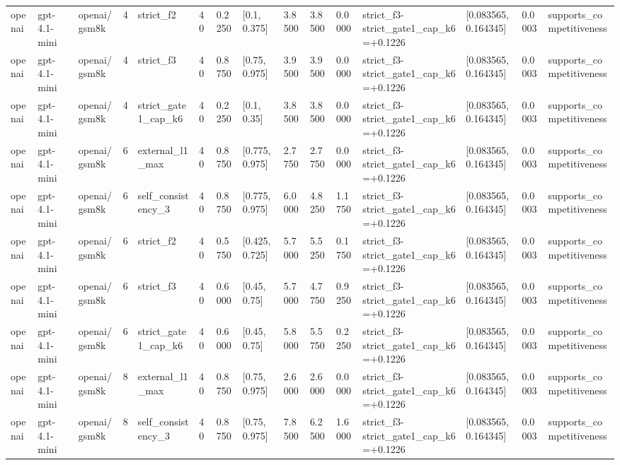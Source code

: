\begin{tabular}{lllllllllllllll}
openai & gpt-4.1-mini & openai/gsm8k & 4 & strict\_f2 & 40 & 0.2250 & [0.1, 0.375] & 3.8500 & 3.8500 & 0.0000 & strict\_f3-strict\_gate1\_cap\_k6=+0.1226 & [0.083565, 0.164345] & 0.0003 & supports\_competitiveness \\
openai & gpt-4.1-mini & openai/gsm8k & 4 & strict\_f3 & 40 & 0.8750 & [0.75, 0.975] & 3.9500 & 3.9500 & 0.0000 & strict\_f3-strict\_gate1\_cap\_k6=+0.1226 & [0.083565, 0.164345] & 0.0003 & supports\_competitiveness \\
openai & gpt-4.1-mini & openai/gsm8k & 4 & strict\_gate1\_cap\_k6 & 40 & 0.2250 & [0.1, 0.35] & 3.8500 & 3.8500 & 0.0000 & strict\_f3-strict\_gate1\_cap\_k6=+0.1226 & [0.083565, 0.164345] & 0.0003 & supports\_competitiveness \\
openai & gpt-4.1-mini & openai/gsm8k & 6 & external\_l1\_max & 40 & 0.8750 & [0.775, 0.975] & 2.7750 & 2.7750 & 0.0000 & strict\_f3-strict\_gate1\_cap\_k6=+0.1226 & [0.083565, 0.164345] & 0.0003 & supports\_competitiveness \\
openai & gpt-4.1-mini & openai/gsm8k & 6 & self\_consistency\_3 & 40 & 0.8750 & [0.775, 0.975] & 6.0000 & 4.8250 & 1.1750 & strict\_f3-strict\_gate1\_cap\_k6=+0.1226 & [0.083565, 0.164345] & 0.0003 & supports\_competitiveness \\
openai & gpt-4.1-mini & openai/gsm8k & 6 & strict\_f2 & 40 & 0.5750 & [0.425, 0.725] & 5.7000 & 5.5250 & 0.1750 & strict\_f3-strict\_gate1\_cap\_k6=+0.1226 & [0.083565, 0.164345] & 0.0003 & supports\_competitiveness \\
openai & gpt-4.1-mini & openai/gsm8k & 6 & strict\_f3 & 40 & 0.6000 & [0.45, 0.75] & 5.7000 & 4.7750 & 0.9250 & strict\_f3-strict\_gate1\_cap\_k6=+0.1226 & [0.083565, 0.164345] & 0.0003 & supports\_competitiveness \\
openai & gpt-4.1-mini & openai/gsm8k & 6 & strict\_gate1\_cap\_k6 & 40 & 0.6000 & [0.45, 0.75] & 5.8000 & 5.5750 & 0.2250 & strict\_f3-strict\_gate1\_cap\_k6=+0.1226 & [0.083565, 0.164345] & 0.0003 & supports\_competitiveness \\
openai & gpt-4.1-mini & openai/gsm8k & 8 & external\_l1\_max & 40 & 0.8750 & [0.75, 0.975] & 2.6000 & 2.6000 & 0.0000 & strict\_f3-strict\_gate1\_cap\_k6=+0.1226 & [0.083565, 0.164345] & 0.0003 & supports\_competitiveness \\
openai & gpt-4.1-mini & openai/gsm8k & 8 & self\_consistency\_3 & 40 & 0.8750 & [0.75, 0.975] & 7.8500 & 6.2500 & 1.6000 & strict\_f3-strict\_gate1\_cap\_k6=+0.1226 & [0.083565, 0.164345] & 0.0003 & supports\_competitiveness \\

\end{tabular}
